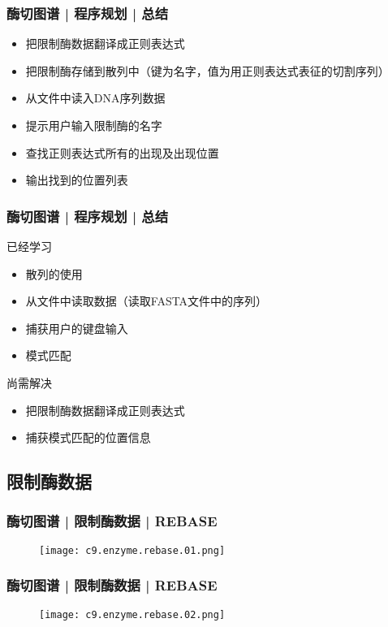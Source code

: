 \begin{frame}
  \frametitle{酶切图谱 | 程序规划 | 总结}
  \begin{itemize}
    \item 把限制酶数据翻译成正则表达式
    \item 把限制酶存储到散列中（键为名字，值为用正则表达式表征的切割序列）
    \item 从文件中读入DNA序列数据
    \item 提示用户输入限制酶的名字
    \item 查找正则表达式所有的出现及出现位置
    \item 输出找到的位置列表
  \end{itemize}
\end{frame}

\begin{frame}
  \frametitle{酶切图谱 | 程序规划 | 总结}
  \begin{block}{已经学习}
    \begin{itemize}
      \item 散列的使用
      \item 从文件中读取数据（读取FASTA文件中的序列）
      \item 捕获用户的键盘输入
      \item 模式匹配
    \end{itemize}
  \end{block}
  \pause
  \begin{block}{尚需解决}
    \begin{itemize}
      \item 把限制酶数据翻译成正则表达式
      \item 捕获模式匹配的位置信息
    \end{itemize}
  \end{block}
\end{frame}

\subsection{限制酶数据}
\begin{frame}
  \frametitle{酶切图谱 | 限制酶数据 | REBASE}
  \begin{figure}
    \centering
    \texttt{[image: c9.enzyme.rebase.01.png]}
  \end{figure}
\end{frame}

\begin{frame}
  \frametitle{酶切图谱 | 限制酶数据 | REBASE}
  \begin{figure}
    \centering
    \texttt{[image: c9.enzyme.rebase.02.png]}
  \end{figure}
\end{frame}

